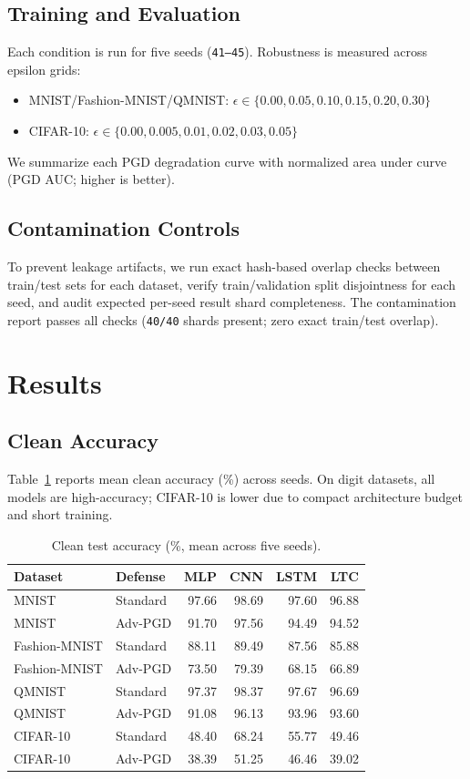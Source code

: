 \documentclass[10pt,twocolumn]{article}
\begin{document}
\subsection{Training and Evaluation}
Each condition is run for five seeds (\texttt{41--45}). Robustness is measured across epsilon grids:
\begin{itemize}
\item MNIST/Fashion-MNIST/QMNIST: $\epsilon \in \{0.00,0.05,0.10,0.15,0.20,0.30\}$
\item CIFAR-10: $\epsilon \in \{0.00,0.005,0.01,0.02,0.03,0.05\}$
\end{itemize}
We summarize each PGD degradation curve with normalized area under curve (PGD AUC; higher is better).

\subsection{Contamination Controls}
To prevent leakage artifacts, we run exact hash-based overlap checks between train/test sets for each dataset, verify train/validation split disjointness for each seed, and audit expected per-seed result shard completeness. The contamination report passes all checks (\texttt{40/40} shards present; zero exact train/test overlap).

\section{Results}
\subsection{Clean Accuracy}
Table~\ref{tab:clean} reports mean clean accuracy (\%) across seeds. On digit datasets, all models are high-accuracy; CIFAR-10 is lower due to compact architecture budget and short training.

\begin{table}[t]
\centering
\caption{Clean test accuracy (\%, mean across five seeds).}
\label{tab:clean}
\small
\begin{tabular}{llrrrr}
\toprule
Dataset & Defense & MLP & CNN & LSTM & LTC \\
\midrule
MNIST & Standard & 97.66 & 98.69 & 97.60 & 96.88 \\
MNIST & Adv-PGD & 91.70 & 97.56 & 94.49 & 94.52 \\
Fashion-MNIST & Standard & 88.11 & 89.49 & 87.56 & 85.88 \\
Fashion-MNIST & Adv-PGD & 73.50 & 79.39 & 68.15 & 66.89 \\
QMNIST & Standard & 97.37 & 98.37 & 97.67 & 96.69 \\
QMNIST & Adv-PGD & 91.08 & 96.13 & 93.96 & 93.60 \\
CIFAR-10 & Standard & 48.40 & 68.24 & 55.77 & 49.46 \\
CIFAR-10 & Adv-PGD & 38.39 & 51.25 & 46.46 & 39.02 \\
\bottomrule
\end{tabular}
\end{table}
\end{document}
